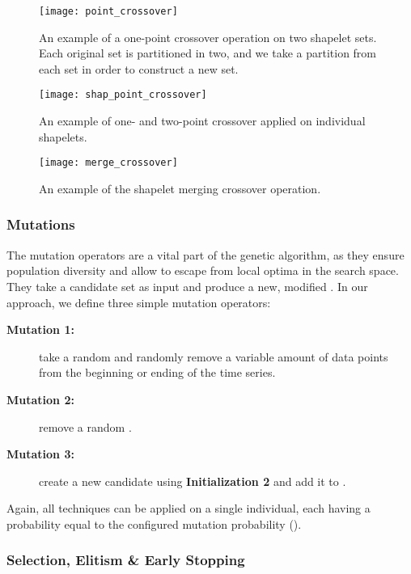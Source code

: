 \documentclass[runningheads]{llncs}
\begin{document}
\begin{figure*}
	\centering
	\texttt{[image: point\_crossover]}
	\caption{An example of a one-point crossover operation on two shapelet sets. Each original set is partitioned in two, and we take a partition from each set in order to construct a new set.}
	\label{fig:crossover1}      
\end{figure*}

\begin{figure*}
	\centering
	\texttt{[image: shap\_point\_crossover]}
	\caption{An example of one- and two-point crossover applied on individual shapelets.}
	\label{fig:crossover2}      
\end{figure*}

\begin{figure*}
	\centering
	\texttt{[image: merge\_crossover]}
	\caption{An example of the shapelet merging crossover operation.}
	\label{fig:crossover3}      
\end{figure*}

\subsubsection{Mutations}\label{subsubsec:mutation}

The mutation operators are a vital part of the genetic algorithm, as they ensure population diversity and allow to escape from local optima in the search space. They take a candidate set  as input and produce a new, modified . In our approach, we define three simple mutation operators: 

\begin{description}
	\item [\textbf{Mutation 1:}] take a random  and randomly remove a variable amount of data points from the beginning or ending of the time series.
	\item [\textbf{Mutation 2:}] remove a random .
	\item [\textbf{Mutation 3:}] create a new candidate using \textbf{Initialization 2} and add it to .
\end{description}

Again, all techniques can be applied on a single individual, each having a probability equal to the configured mutation probability ().

\subsubsection{Selection, Elitism \& Early Stopping}\label{subsubsec:selection}
\end{document}
